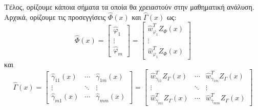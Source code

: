 Τέλος, ορίζουμε κάποια σήματα τα οποία θα χρειαστούν στην μαθηματική ανάλυση. Αρχικά, ορίζουμε τις προσεγγίσεις $\hat{\Phi}(x)$ και $\hat{\Gamma}(x)$ ως:
\begin{equation}
	\hat{\Phi}(x) = 
	\begin{bmatrix}
	\hat{\varphi}_1 \\ \vdots \\ \hat{\varphi}_m
	\end{bmatrix}
	= 
	\begin{bmatrix}
	 \hat{w}_{\varphi_1}^T Z_{\Phi}(x) \\ \vdots \\ \hat{w}_{\varphi_1}^T Z_{\Phi}(x)
	\end{bmatrix}
	\label{eq:phi_approx}
\end{equation}
και
\begin{equation}
\hat{\Gamma}(x) = 
\begin{bmatrix} \hat{\gamma}_{11}(x) & \cdots & \hat{\gamma}_{1m}(x) \\
	\vdots    & \ddots & \vdots         \\
	\hat{\gamma}_{m1}(x) & \cdots & \hat{\gamma}_{mm}(x)
\end{bmatrix}
=
\begin{bmatrix} \hat{w}_{\gamma_{11}}^T Z_{\Gamma}(x) & \cdots & \hat{w}_{\gamma_{1m}}^T Z_{\Gamma}(x) \\
\vdots    & \ddots & \vdots         \\
\hat{w}_{\gamma_{m1}}^T Z_{\Gamma}(x) & \cdots & \hat{w}_{\gamma_{mm}}^T Z_{\Gamma}(x)
\end{bmatrix}
\label{eq:gamma_approx}
\end{equation}

